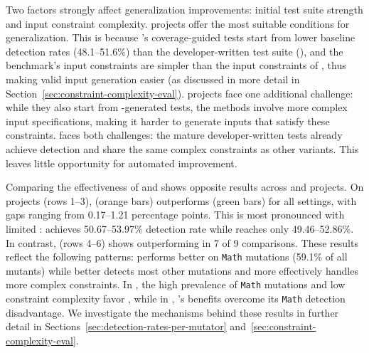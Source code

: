 Two factors strongly affect generalization improvements:
initial test suite strength and input constraint complexity.
\DatasetsEqBenchEs{} projects offer the most suitable conditions for generalization.
This is because \ToolEvoSuite{}'s coverage-guided tests start from lower baseline detection rates
(48.1--51.6\%)
than the developer-written \DatasetCommonsDev{} test suite (\TzEffectivenessCommonsDeveloperBaselineMutationScorePct{}),
and the \DatasetEqBench{} benchmark's input constraints
are simpler than the input constraints of \DatasetsCommons{},
thus making valid input generation easier
(as discussed in more detail in Section~\ref{sec:constraint-complexity-eval}).
\DatasetsCommonsEs{} projects face one additional challenge:
while they also start from \ToolEvoSuite{}-generated tests,
the \DatasetsCommons{} methods involve more complex input specifications,
making it harder to generate inputs that satisfy these constraints.
\DatasetCommonsDev{} faces both challenges:
the mature developer-written tests already achieve \TzEffectivenessCommonsDeveloperBaselineMutationScorePct{} detection
and share the same complex constraints as other \DatasetsCommons{} variants.
This leaves little opportunity for automated improvement.

Comparing the effectiveness of \VariantNaive{} and \VariantImproved{}
shows opposite results across \DatasetsEqBenchEs{} and \DatasetsCommonsEs{} projects.
On \DatasetsEqBenchEs{} projects (rows 1--3), \VariantNaive{} (orange bars)
outperforms \VariantImproved{} (green bars) for all \tries{} settings,
with gaps ranging from 0.17--1.21 percentage points.
This is most pronounced with limited \tries{}:
\VariantNaiveA{} achieves 50.67--53.97\% detection rate
while \VariantImprovedA{} reaches only 49.46--52.86\%.
In contrast, \DatasetsCommonsEs{} (rows 4--6) shows \VariantImproved{}
outperforming \VariantNaive{} in 7 of 9 comparisons.
These results reflect the following patterns:
\VariantNaive{} performs better on \texttt{Math} mutations (59.1\% of all mutants)
while \VariantImproved{} better detects most other mutations
and more effectively handles more complex constraints.
In \DatasetsEqBenchEs{}, the high prevalence of \texttt{Math} mutations
and low constraint complexity favor \VariantNaive{},
while in \DatasetsCommonsEs{}, \VariantImproved{}'s
benefits overcome its \texttt{Math} detection disadvantage.
We investigate the mechanisms behind these results in further detail in
Sections~\ref{sec:detection-rates-per-mutator} and~\ref{sec:constraint-complexity-eval}.

